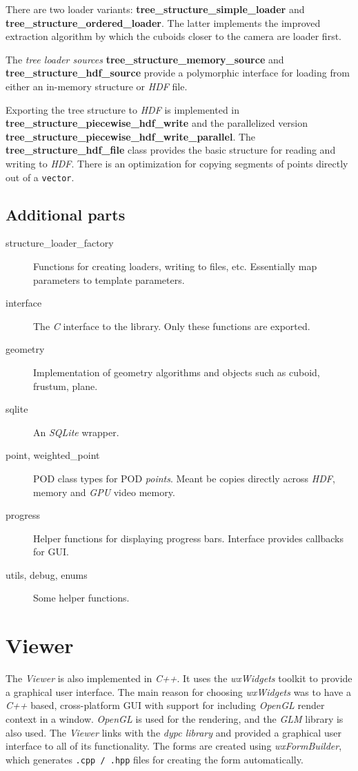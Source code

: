 \documentclass[a4paper,10pt,abstracton,notitlepage]{scrreprt}
\begin{document}
There are two loader variants: \textbf{tree\_structure\_simple\_loader} and \textbf{tree\_structure\_ordered\_loader}. The latter implements the improved extraction algorithm by which the cuboids closer to the camera are loader first.

The \emph{tree loader sources} \textbf{tree\_structure\_memory\_source} and \textbf{tree\_structure\_hdf\_source} provide a polymorphic interface for loading from either an in-memory structure or \emph{HDF} file.

Exporting the tree structure to \emph{HDF} is implemented in \textbf{tree\_structure\_piecewise\_hdf\_write} and the parallelized version \textbf{tree\_structure\_piecewise\_hdf\_write\_parallel}. The \textbf{tree\_structure\_hdf\_file} class provides the basic structure for reading and writing to \emph{HDF}. There is an optimization for copying segments of points directly out of a \texttt{vector}.


\subsection{Additional parts}
\begin{description}
\item[structure\_loader\_factory] Functions for creating loaders, writing to files, etc. Essentially map parameters to template parameters.
\item[interface] The \emph{C} interface to the library. Only these functions are exported.
\item[geometry] Implementation of geometry algorithms and objects such as cuboid, frustum, plane.
\item[sqlite] An \emph{SQLite} wrapper.
\item[point, weighted\_point] POD class types for POD \emph{points}. Meant be copies directly across \emph{HDF}, memory and \emph{GPU} video memory.
\item[progress] Helper functions for displaying progress bars. Interface provides callbacks for GUI.
\item[utils, debug, enums] Some helper functions.
\end{description}


\pagebreak

\section{Viewer}
The \emph{Viewer} is also implemented in \emph{C++}. It uses the \emph{wxWidgets} toolkit to provide a graphical user interface. The main reason for choosing \emph{wxWidgets} was to have a \emph{C++} based, cross-platform GUI with support for including \emph{OpenGL} render context in a window.
\emph{OpenGL} is used for the rendering, and the \emph{GLM} library is also used. The \emph{Viewer} links with the \emph{dypc library} and provided a graphical user interface to all of its functionality. The forms are created using \emph{wxFormBuilder}, which generates \texttt{.cpp / .hpp} files for creating the form automatically.
\end{document}
